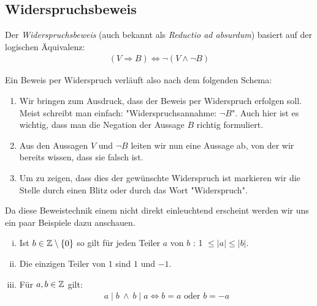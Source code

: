 \subsection{Widerspruchsbeweis} %

Der \textit{Widerspruchsbeweis} (auch bekannt als \textit{Reductio ad absurdum}) basiert auf der logischen Äquivalenz: 
\begin{align*}
    (V \Rightarrow B) \iff \neg (V \wedge \neg B)
\end{align*}

Ein Beweis per Widerspruch verläuft also nach dem folgenden Schema: 
\begin{enumerate}
    \item 
    Wir bringen zum Ausdruck, dass der Beweis per Widerspruch erfolgen soll. Meist schreibt man einfach: "Widerspruchsannahme: $\neg B$". 
    Auch hier ist es wichtig, dass man die Negation der Aussage $B$ richtig formuliert. 
    \item 
    Aus den Aussagen $V$ und $\neg B$ leiten wir nun eine Aussage ab, von der wir bereits wissen, dass sie falsch ist. 
    \item 
    Um zu zeigen, dass dies der gewünschte Widerspruch ist markieren wir die Stelle durch einen Blitz oder durch das Wort "Widerspruch". 
\end{enumerate}

Da diese Beweistechnik einem nicht direkt einleuchtend erscheint werden wir uns ein paar Beispiele dazu anschauen. 

\begin{lemma}
    \begin{enumerate}[(i)]
        \item 
        Ist $b \in \mathbb{Z} \setminus \{0\}$ so gilt für jeden Teiler $a$ von $b$ : 1 $\leq \lvert a \rvert \leq \lvert b \rvert$. 
        \item 
        Die einzigen Teiler von $1$ sind $1$ und $-1$. 
        \item 
        Für $a,b \in \mathbb{Z}$ gilt: 
        \begin{align*}
            a \mid b \ \wedge \ b \mid a \iff b = a \text{  oder } b = -a
        \end{align*}
    \end{enumerate}
\end{lemma}

